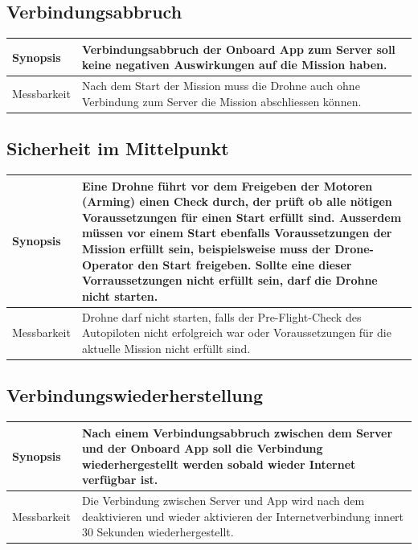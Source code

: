 \subsection{Verbindungsabbruch}

\begin{tabular}{|p{}|p{}|} \hline
	Synopsis & Verbindungsabbruch der Onboard App zum Server soll keine negativen Auswirkungen auf die Mission haben.  \\ \hline
		
	Messbarkeit & Nach dem Start der Mission muss die Drohne auch ohne Verbindung zum Server die Mission abschliessen können. \\ \hline
\end{tabular}

\subsection{Sicherheit im Mittelpunkt}
\begin{tabular}{|p{}|p{}|} \hline
	Synopsis & Eine Drohne führt vor dem Freigeben der Motoren (Arming) einen Check durch, der prüft ob alle nötigen Voraussetzungen für einen Start erfüllt sind. Ausserdem müssen vor einem Start ebenfalls Voraussetzungen der Mission erfüllt sein, beispielsweise muss der Drone-Operator den Start freigeben. Sollte eine dieser Vorraussetzungen nicht erfüllt sein, darf die Drohne nicht starten.  \\ \hline
	
	Messbarkeit & Drohne darf nicht starten, falls der Pre-Flight-Check des Autopiloten nicht erfolgreich war oder Voraussetzungen für die aktuelle Mission nicht erfüllt sind. \\ \hline
\end{tabular}

\subsection{Verbindungswiederherstellung}
\begin{tabular}{|p{}|p{}|} \hline
	Synopsis & Nach einem Verbindungsabbruch zwischen dem Server und der Onboard App soll die Verbindung wiederhergestellt werden sobald wieder Internet verfügbar ist. \\ \hline
	
	Messbarkeit & Die Verbindung zwischen Server und App wird nach dem deaktivieren und wieder aktivieren der Internetverbindung innert 30 Sekunden wiederhergestellt.\\ \hline
\end{tabular}


